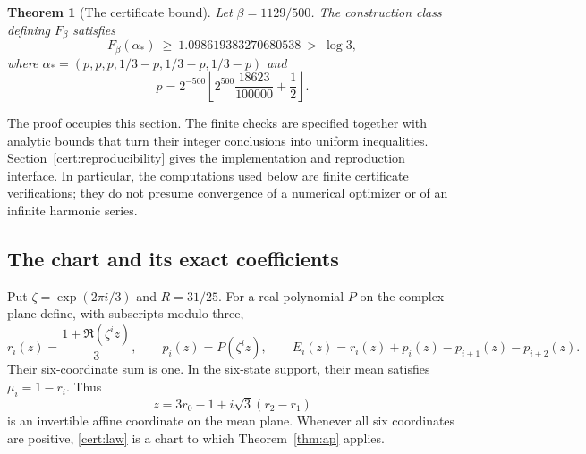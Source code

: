 \documentclass[11pt]{article}
\numberwithin{equation}{section}
\newtheorem{theorem}{Theorem}[section]
\theoremstyle{definition}
\theoremstyle{remark}
\begin{document}
\begin{theorem}[The certificate bound]\label{thm:certificate}
Let $\beta=1129/500$.  The construction class defining $F_\beta$ satisfies
\[
 F_\beta(\alpha_*)\ \geq\ 1.098619383270680538
     \ >\ \log 3,
\]
where $\alpha_*=(p,p,p,1/3-p,1/3-p,1/3-p)$ and
\[
 p=2^{-500}\left\lfloor 2^{500}\frac{18623}{100000}
                                      +\frac12\right\rfloor.
\]
\end{theorem}

The proof occupies this section.  The finite checks are specified together
with analytic bounds that turn their integer conclusions into uniform
inequalities.  Section~\ref{cert:reproducibility} gives the implementation
and reproduction interface.  In particular, the computations used below are
finite certificate verifications; they do not presume convergence of a
numerical optimizer or of an infinite harmonic series.

\subsection{The chart and its exact coefficients}
\label{cert:chart}

Put $\zeta=\exp(2\pi i/3)$ and $R=31/25$.  For a real polynomial $P$ on the
complex plane define, with subscripts modulo three,
\begin{equation}\label{cert:law}
 r_i(z)=\frac{1+\Re(\zeta^i z)}3,\qquad
 p_i(z)=P(\zeta^i z),\qquad
 E_i(z)=r_i(z)+p_i(z)-p_{i+1}(z)-p_{i+2}(z).
\end{equation}
Their six-coordinate sum is one.  In the six-state support, their mean
satisfies $\mu_i=1-r_i$.  Thus
\[
 z=3r_0-1+i\sqrt3(r_2-r_1)
\]
is an invertible affine coordinate on the mean plane.  Whenever all six
coordinates are positive, \eqref{cert:law} is a chart to which
Theorem~\ref{thm:ap} applies.
\end{document}
